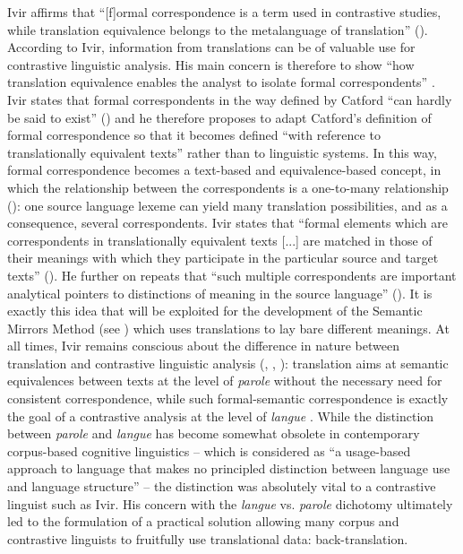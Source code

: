 Ivir affirms that “[f]ormal correspondence is a term used in contrastive studies, while translation equivalence belongs to the metalanguage of translation” (\citeyear[51]{ivir_formal_1981}). According to Ivir, information from translations can be of valuable use for contrastive linguistic analysis. His main concern is therefore to show “how translation equivalence enables the analyst to isolate formal correspondents” \citep[58]{ivir_formal_1981}. Ivir states that formal correspondents in the way defined by Catford “can hardly be said to exist” (\citeyear[54]{ivir_formal_1981}) and he therefore proposes to adapt Catford’s definition of formal correspondence so that it becomes defined “with reference to translationally equivalent texts” \citep[55]{ivir_formal_1981} rather than to linguistic systems. In this way, formal correspondence becomes a text-based and equivalence-based concept, in which the relationship between the correspondents is a one-to-many relationship (\citeyear[55]{ivir_formal_1981}): one source language lexeme can yield many translation possibilities, and as a consequence, several correspondents. Ivir states that “formal elements which are correspondents in translationally equivalent texts [...] are matched in those of their meanings with which they participate in the particular source and target texts” (\citeyear[55]{ivir_formal_1981}). He further on repeats that “such multiple correspondents are important analytical pointers to distinctions of meaning in the source language” (\citeyear[56]{ivir_formal_1981}). It is exactly this idea that will be exploited for the development of the Semantic Mirrors Method (see ) which uses translations to lay bare different meanings. At all times, Ivir remains conscious about the difference in nature between translation and contrastive linguistic analysis (\citealt[15]{ivir_contrasting_1969}, \citealt[17]{ivir_remarks_1970}, \citealt[173]{ivir_translation-based_1983}): translation aims at semantic equivalences between texts at the level of \textit{parole} without the necessary need for consistent correspondence, while such formal-semantic correspondence is exactly the goal of a contrastive analysis at the level of \textit{langue} \citep[15]{ivir_contrasting_1969}. While the distinction between \textit{parole} and \textit{langue} has become somewhat obsolete in contemporary corpus-based cognitive linguistics – which is considered as “a usage-based approach to language that makes no principled distinction between language use and language structure” \citep[151]{glynn_visualizing_2014} – the distinction was absolutely vital to a contrastive linguist such as Ivir. His concern with the \textit{langue} vs. \textit{parole} dichotomy ultimately led to the formulation of a practical solution allowing many corpus and contrastive linguists to fruitfully use translational data: back-translation.

